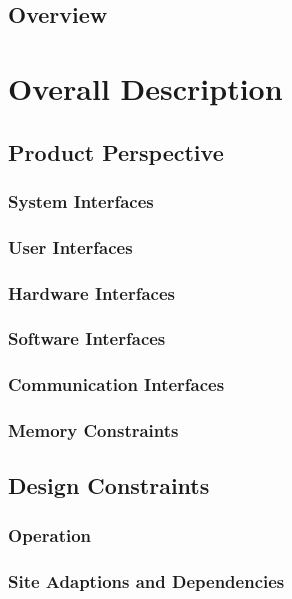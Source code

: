 \documentclass[letterpaper,10pt,titlepage,draftclsnofoot,onecolumn]{IEEEtran}
\begin{document}
\subsection{Overview}

\section{Overall Description}

\subsection{Product Perspective}

\subsubsection{System Interfaces}

\subsubsection{User Interfaces}

\subsubsection{Hardware Interfaces}

\subsubsection{Software Interfaces}

\subsubsection{Communication Interfaces}

\subsubsection{Memory Constraints}

\subsection{Design Constraints}

\subsubsection{Operation}

\subsubsection{Site Adaptions and Dependencies}
\end{document}
